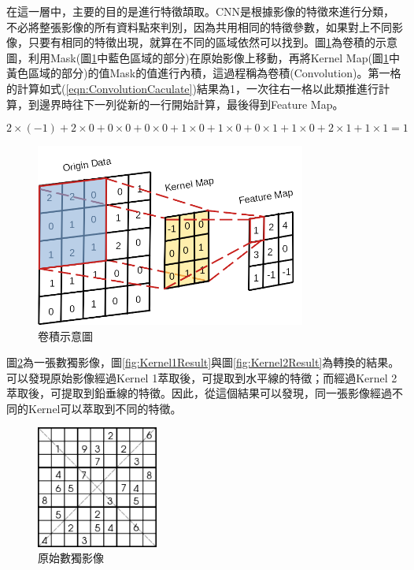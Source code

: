 在這一層中，主要的目的是進行特徵頡取。CNN是根據影像的特徵來進行分類，不必將整張影像的所有資料點來判別，因為共用相同的特徵參數，如果對上不同影像，只要有相同的特徵出現，就算在不同的區域依然可以找到。圖\ref{fig:Convolution}為卷積的示意圖，利用Mask(圖\ref{fig:Convolution}中藍色區域的部分)在原始影像上移動，再將Kernel Map(圖\ref{fig:Convolution}中黃色區域的部分)的值Mask的值進行內積，這過程稱為卷積(Convolution)。第一格的計算如式(\ref{eqn:ConvolutionCaculate})結果為1，一次往右一格以此類推進行計算，到邊界時往下一列從新的一行開始計算，最後得到Feature Map。

\begin{equation}
	\label{eqn:ConvolutionCaculate}
	2\times(-1)+2\times0+0\times0+0\times0+1\times0+1\times0+0\times1+1\times0+2\times1+1\times1=1
\end{equation}


\begin{figure}[H]
	\centerline{\includegraphics[height=6cm]{./pic/kBPwTe69.png}}
	\caption{卷積示意圖}
	\label{fig:Convolution}
\end{figure}


\newpage


圖\ref{fig:OriGrayImg}為一張數獨影像，圖\ref{fig:Kernel1Result}與圖\ref{fig:Kernel2Result}為轉換的結果。可以發現原始影像經過Kernel 1萃取後，可提取到水平線的特徵；而經過Kernel 2萃取後，可提取到鉛垂線的特徵。因此，從這個結果可以發現，同一張影像經過不同的Kernel可以萃取到不同的特徵。
\begin{figure}[H]
	\centerline{\includegraphics[height=4cm]{pic/gray_img.png}}
	\caption{原始數獨影像}
	\label{fig:OriGrayImg}
\end{figure}


